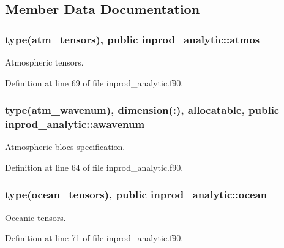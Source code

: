\subsection{Member Data Documentation}
\hypertarget{classinprod__analytic_a6f4fe9aa292d78b871e5498e411d1297}{
\subsubsection[{atmos}]{\setlength{\rightskip}{0pt plus 5cm}type({\bf atm\-\_\-tensors}), public inprod\-\_\-analytic\-::atmos}}\label{classinprod__analytic_a6f4fe9aa292d78b871e5498e411d1297}


Atmospheric tensors. 



Definition at line 69 of file inprod\-\_\-analytic.\-f90.

\hypertarget{classinprod__analytic_aa6b6ebedac44495720ffe649bc937a56}{
\subsubsection[{awavenum}]{\setlength{\rightskip}{0pt plus 5cm}type({\bf atm\-\_\-wavenum}), dimension(\-:), allocatable, public inprod\-\_\-analytic\-::awavenum}}\label{classinprod__analytic_aa6b6ebedac44495720ffe649bc937a56}


Atmospheric blocs specification. 



Definition at line 64 of file inprod\-\_\-analytic.\-f90.

\hypertarget{classinprod__analytic_ac691a1258fb0a341e2ba5b4811be1c0b}{
\subsubsection[{ocean}]{\setlength{\rightskip}{0pt plus 5cm}type({\bf ocean\-\_\-tensors}), public inprod\-\_\-analytic\-::ocean}}\label{classinprod__analytic_ac691a1258fb0a341e2ba5b4811be1c0b}


Oceanic tensors. 



Definition at line 71 of file inprod\-\_\-analytic.\-f90.

